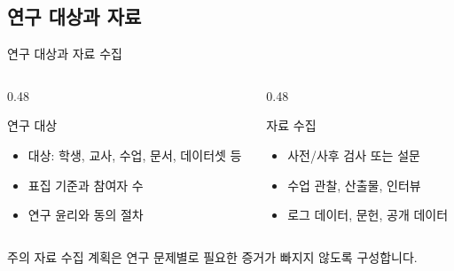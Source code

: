 \subsection{연구 대상과 자료}
\begin{frame}[t]{연구 대상과 자료 수집}
\small

\begin{columns}[T]

\begin{column}{0.48\textwidth}
\begin{block}{연구 대상}
\begin{itemize}
\tightitems

\item 대상: 학생, 교사, 수업, 문서, 데이터셋 등
\item 표집 기준과 참여자 수
\item 연구 윤리와 동의 절차
\end{itemize}
\end{block}
\end{column}

\begin{column}{0.48\textwidth}
\begin{block}{자료 수집}
\begin{itemize}
\tightitems

\item 사전/사후 검사 또는 설문
\item 수업 관찰, 산출물, 인터뷰
\item 로그 데이터, 문헌, 공개 데이터
\end{itemize}
\end{block}
\end{column}
\end{columns}

\vspace{0.25cm}

\begin{alertblock}{주의}
자료 수집 계획은 연구 문제별로 필요한 증거가 빠지지 않도록 구성합니다.
\end{alertblock}

\end{frame}

